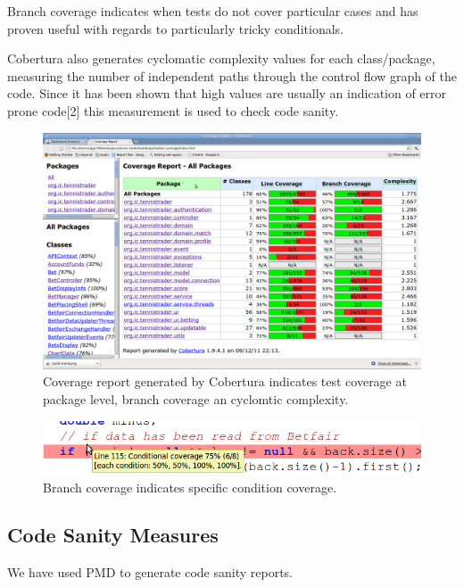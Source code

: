 \documentclass[10pt]{article}
\begin{document}
Branch coverage indicates when tests do not cover particular cases and has proven useful with regards to particularly tricky conditionals.

Cobertura also generates cyclomatic complexity values for each class/package, measuring the number of independent paths through the control flow graph of the code. Since it has been shown that high values are usually an indication of error prone code[2] this measurement is used to check code sanity.

\begin{figure}[ht]
\centering
\includegraphics[bb=0 0 1680 1050, scale = 0.2]{coverage.png}
\caption{Coverage report generated by Cobertura indicates test coverage at package level, branch coverage an cyclomtic complexity.}
\end{figure}



\begin{figure}[ht]
\centering
\includegraphics[bb=0 0 700 100, scale = 0.49]{branch.png}
\caption{Branch coverage indicates specific condition coverage.}
\end{figure}

\subsection{Code Sanity Measures}

We have used PMD to generate code sanity reports.
\end{document}
